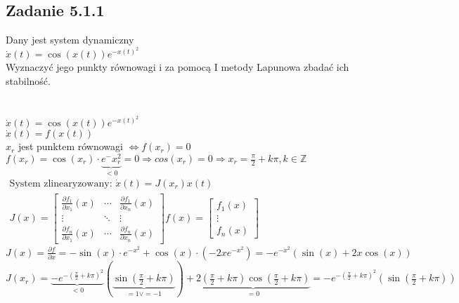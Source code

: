 \subsection*{Zadanie 5.1.1} {\color{darkgray}
	Dany jest system dynamiczny\\
	$\dot{x}(t)= \cos(x(t))e^{-x(t)^2}$\\
	Wyznaczyć jego punkty równowagi i za pomocą I metody Lapunowa zbadać ich stabilność.\\
}\lineh
\\\\
$\dot{x}(t)=\cos(x(t))e^{-x(t)^2}$\\
$\dot{x}(t)=f(x(t))$\\
$x_r$ jest punktem równowagi $ \Leftrightarrow f(x_r)=0$\\
$f(x_r)=\cos(x_r)\cdot \underbrace{e^-x_r^2}_{<0}=0 \Rightarrow cos(x_r)=0 \Rightarrow x_r=\frac{\pi}{2}+k\pi, k \in \mathbb{Z}$\\
$\boxed{\begin{aligned}
\text{System zlinearyzowany: } \dot{x}(t)=J(x_r)x(t)\\
J(x)=\left[ \begin{array}{ccc} 
 \frac{\partial f_1}{\partial x_1}(x) & \cdots &  \frac{\partial f_1}{\partial x_n}(x)\\
\vdots & \ddots & \vdots\\
\frac{\partial f_n}{\partial x_1}(x) &\cdots & \frac{\partial f_n}{\partial x_n}(x) 
  \end{array}\right] f(x)= \left[ \begin{array}{c}  f_1(x)   \\ \vdots \\ f_n(x)    \end{array}\right]
\end{aligned}}$\\
$J(x)=\frac{\partial f}{\partial x} = - \sin(x) \cdot e^{-x^2}+\cos(x) \cdot (-2xe^{-x^2})=-e^{-x^2}(\sin(x)+2x\cos(x))$\\
$J(x_r)=\underbrace{-e^{-(\frac{\pi}{2}+k\pi)^2}}_{<0}(\underbrace{\sin(\frac{\pi}{2}+k\pi)}_{=1 \vee =-1})+\underbrace{2(\frac{\pi}{2}+k\pi)\cos(\frac{\pi}{2}+k\pi)}_{=0}=-e^{-(\frac{\pi}{2}+k\pi)^2} (\sin(\frac{\pi}{2}+k\pi))$\\
\\
\\

